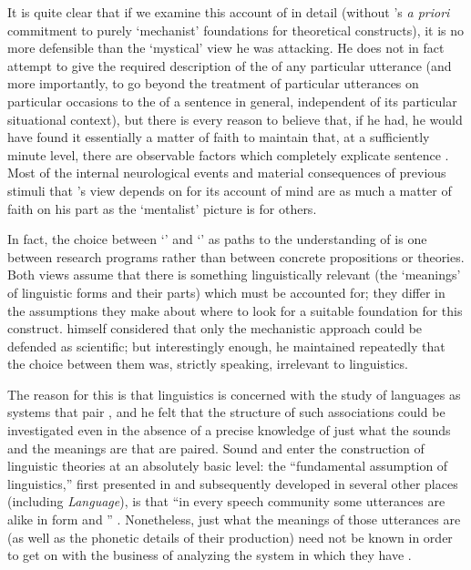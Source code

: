 It is quite clear that if we examine this account of  in detail
(without {\Bloomfield}'s \emph{a priori} commitment to purely `mechanist'
foundations for theoretical constructs), it is no more defensible than
the `mystical' view he was attacking. He does not in fact attempt to
give the required description of the  of any particular
utterance (and more importantly, to go beyond the treatment of
particular utterances on particular occasions to the  of a
sentence in general, independent of its particular situational
context), but there is every reason to believe that, if he had, he
would have found it essentially a matter of faith to maintain that, at
a sufficiently minute level, there are observable factors which
completely explicate sentence . Most of the internal
neurological events and material consequences of previous stimuli that
{\Bloomfield}'s view depends on for its account of mind are as much a
matter of faith on his part as the `mentalist' picture is for others.

In fact, the choice between `' and `' as paths to
the understanding of  is one between research programs rather
than between concrete propositions or theories. Both views assume that
there is something linguistically relevant (the `meanings' of
linguistic forms and their parts) which must be accounted for; they
differ in the assumptions they make about where to look for a suitable
foundation for this construct. {\Bloomfield} himself considered that only
the mechanistic approach could be defended as scientific; but
interestingly enough, he maintained repeatedly that the choice between
them was, strictly speaking, irrelevant to linguistics.

The reason for this is that linguistics is concerned with the study of
languages as systems that pair , and he felt that the
structure of such associations could be investigated even in the
absence of a precise knowledge of just what the sounds and the
meanings are that are paired. Sound and  enter the construction
of linguistic theories at an absolutely basic level: the ``fundamental
assumption of linguistics,'' first presented in
\citealt{bloomfield26:postulates} and subsequently developed in
several other places (including \textsl{Language}), is that ``in every
speech community some utterances are alike in form and ''
\citep[78]{bloomfield:lg}. Nonetheless, just what the meanings of
those utterances are (as well as the phonetic details of their
production) need not be known in order to get on with the business of
analyzing the system in which they have .

